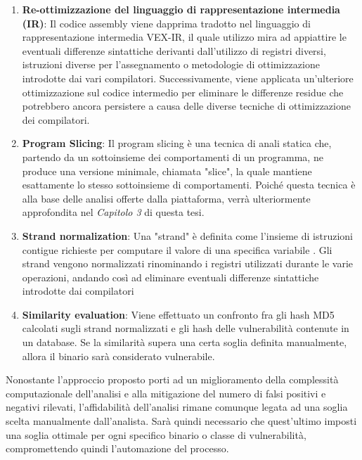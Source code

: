 \documentclass[../main.tex]{subfiles}
\begin{document}
\begin{enumerate}
    \item \textbf{Re-ottimizzazione del linguaggio di rappresentazione intermedia (IR)}: Il codice assembly viene dapprima tradotto nel linguaggio di rappresentazione intermedia VEX-IR, il quale utilizzo
    mira ad appiattire le eventuali differenze sintattiche derivanti dall'utilizzo di registri diversi, istruzioni diverse per l'assegnamento o metodologie di ottimizzazione introdotte dai vari compilatori.
    Successivamente, viene applicata un'ulteriore ottimizzazione sul codice intermedio per eliminare le differenze residue che potrebbero ancora persistere a causa delle diverse tecniche di ottimizzazione dei compilatori.
    \item \textbf{Program Slicing}: Il program slicing è una tecnica di anali statica che, partendo da un sottoinsieme dei comportamenti di un programma, ne produce una versione minimale, chiamata "slice",  la quale mantiene esattamente lo stesso sottoinsieme di comportamenti.
    Poiché questa tecnica è alla base delle analisi offerte dalla piattaforma, verrà ulteriormente approfondita nel \textit{Capitolo 3} di questa tesi.
    \item \textbf{Strand normalization}: Una "strand" è definita come l'insieme di istruzioni contigue richieste per computare il valore di una specifica variabile \cite{Statistical_similarities_in_binaries}.
    Gli strand vengono normalizzati rinominando i registri utilizzati durante le varie operazioni, andando così ad eliminare eventuali differenze sintattiche introdotte dai compilatori
    \item \textbf{Similarity evaluation}: Viene effettuato un confronto fra gli hash MD5 calcolati sugli strand normalizzati e gli hash delle vulnerabilità contenute in un database. Se la similarità supera una certa soglia definita manualmente, allora
    il binario sarà considerato vulnerabile.
\end{enumerate}
Nonostante l'approccio proposto porti ad un miglioramento della complessità computazionale dell'analisi e alla mitigazione del numero di falsi positivi e negativi rilevati, l'affidabilità dell'analisi rimane comunque legata ad una soglia scelta manualmente dall'analista.
Sarà quindi necessario che quest'ultimo imposti una soglia ottimale per ogni specifico binario o classe di vulnerabilità, compromettendo quindi l'automazione del processo.
\end{document}
